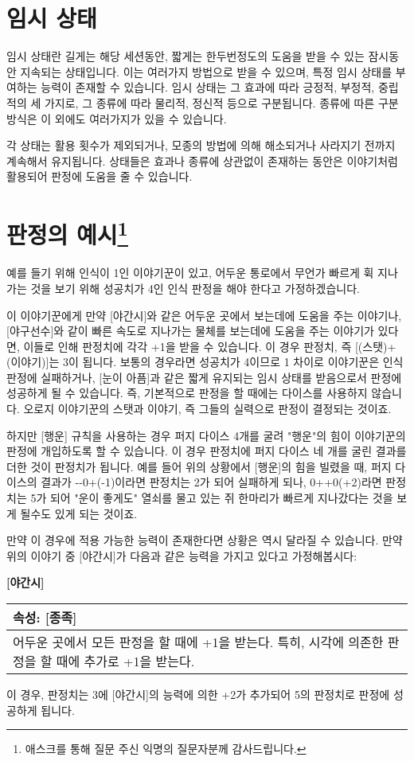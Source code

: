 \documentclass[12pt]{report}
\newenvironment{story}[2]
{\begin{center}
		{\large \textbf{[#1]}}\\[1ex]
		\begin{tabular}{|p{\textwidth}|}
			\hline
			\textbf{속성}: #2
			\\
			\hline
		}
		{ 
			\\\hline
		\end{tabular}
	\end{center}
}
\begin{document}
	\section*{임시 상태}
	임시 상태란 길게는 해당 세션동안, 짧게는 한두번정도의 도움을 받을 수 있는 잠시동안 지속되는 상태입니다. 이는 여러가지 방법으로 받을 수 있으며, 특정 임시 상태를 부여하는 능력이 존재할 수 있습니다. 임시 상태는 그 효과에 따라 긍정적, 부정적, 중립적의 세 가지로, 그 종류에 따라 물리적, 정신적 등으로 구분됩니다. 종류에 따른 구분 방식은 이 외에도 여러가지가 있을 수 있습니다.
	
	각 상태는 활용 횟수가 제외되거나, 모종의 방법에 의해 해소되거나 사라지기 전까지 계속해서 유지됩니다. 상태들은 효과나 종류에 상관없이 존재하는 동안은 이야기처럼 활용되어 판정에 도움을 줄 수 있습니다.
	
	\section*{판정의 예시\footnote{애스크를 통해 질문 주신 익명의 질문자분께 감사드립니다.}}
	
	예를 들기 위해 인식이 1인 이야기꾼이 있고, 어두운 통로에서 무언가 빠르게 휙 지나가는 것을 보기 위해 성공치가 4인 인식 판정을 해야 한다고 가정하겠습니다.
	
	이 이야기꾼에게 만약 [야간시]와 같은 어두운 곳에서 보는데에 도움을 주는 이야기나, [야구선수]와 같이 빠른 속도로 지나가는 물체를 보는데에 도움을 주는 이야기가 있다면, 이들로 인해 판정치에 각각 +1을 받을 수 있습니다. 이 경우 판정치, 즉 [(스탯)+(이야기)]는 3이 됩니다. 보통의 경우라면 성공치가 4이므로 1 차이로 이야기꾼은 인식 판정에 실패하거나, [눈이 아픔]과 같은 짧게 유지되는 임시 상태를 받음으로서 판정에 성공하게 될 수 있습니다. 즉, 기본적으로 판정을 할 때에는 다이스를 사용하지 않습니다. 오로지 이야기꾼의 스탯과 이야기, 즉 그들의 실력으로 판정이 결정되는 것이죠.
	
	하지만 [행운] 규칙을 사용하는 경우 퍼지 다이스 4개를 굴려 "행운"의 힘이 이야기꾼의 판정에 개입하도록 할 수 있습니다. 이 경우 판정치에 퍼지 다이스 네 개를 굴린 결과를 더한 것이 판정치가 됩니다. 예를 들어 위의 상황에서 [행운]의 힘을 빌렸을 때, 퍼지 다이스의 결과가 -{}-0+(-1)이라면 판정치는 2가 되어 실패하게 되나, 0++0(+2)라면 판정치는 5가 되어 "운이 좋게도" 열쇠를 물고 있는 쥐 한마리가 빠르게 지나갔다는 것을 보게 될수도 있게 되는 것이죠.
	
	만약 이 경우에 적용 가능한 능력이 존재한다면 상황은 역시 달라질 수 있습니다. 만약 위의 이야기 중 [야간시]가 다음과 같은 능력을 가지고 있다고 가정해봅시다:
	\begin{story}{야간시}{[종족]}
		어두운 곳에서 모든 판정을 할 때에 +1을 받는다. 특히, 시각에 의존한 판정을 할 때에 추가로 +1을 받는다.
	\end{story}
	이 경우, 판정치는 3에 [야간시]의 능력에 의한 +2가 추가되어 5의 판정치로 판정에 성공하게 됩니다.
	
\end{document}
